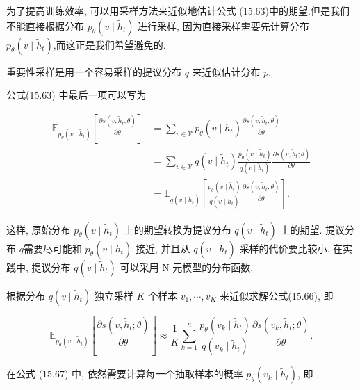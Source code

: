 \documentclass[10pt]{article}
\begin{document}
为了提高训练效率, 可以用采样方法来近似地估计公式 (15.63)中的期望.但是我们不能直接根据分布 $p_{\theta}\left(v \mid \tilde{h}_{t}\right)$ 进行采样, 因为直接采样需要先计算分布 $p_{\theta}\left(v \mid \tilde{h}_{t}\right)$,而这正是我们希望避免的.

重要性采样是用一个容易采样的提议分布 $q$ 来近似估计分布 $p$.

公式(15.63) 中最后一项可以写为


\begin{align*}
\mathbb{E}_{p_{\theta}\left(v \mid \tilde{h}_{t}\right)}\left[\frac{\partial s\left(v, \tilde{h}_{t} ; \theta\right)}{\partial \theta}\right] & =\sum_{v \in \mathcal{V}} p_{\theta}\left(v \mid \tilde{h}_{t}\right) \frac{\partial s\left(v, \tilde{h}_{t} ; \theta\right)}{\partial \theta}  \tag{15.64}\\
& =\sum_{v \in \mathcal{V}} q\left(v \mid \tilde{h}_{t}\right) \frac{p_{\theta}\left(v \mid \tilde{h}_{t}\right)}{q\left(v \mid \tilde{h}_{t}\right)} \frac{\partial s\left(v, \tilde{h}_{t} ; \theta\right)}{\partial \theta}  \tag{15.65}\\
& =\mathbb{E}_{q\left(v \mid \tilde{h}_{t}\right)}\left[\frac{p_{\theta}\left(v \mid \tilde{h}_{t}\right)}{q\left(v \mid \tilde{h}_{t}\right)} \frac{\partial s\left(v, \tilde{h}_{t} ; \theta\right)}{\partial \theta}\right] . \tag{15.66}
\end{align*}


这样, 原始分布 $p_{\theta}\left(v \mid \tilde{h}_{t}\right)$ 上的期望转换为提议分布 $q\left(v \mid \tilde{h}_{t}\right)$ 上的期望. 提议分布 $q$需要尽可能和 $p_{\theta}\left(v \mid \tilde{h}_{t}\right)$ 接近, 并且从 $q\left(v \mid \tilde{h}_{t}\right)$ 采样的代价要比较小. 在实践中, 提议分布 $q\left(v \mid \tilde{h}_{t}\right)$ 可以采用 $\mathrm{N}$ 元模型的分布函数.

根据分布 $q\left(v \mid \tilde{h}_{t}\right)$ 独立采样 $K$ 个样本 $v_{1}, \cdots, v_{K}$ 来近似求解公式(15.66), 即


\begin{equation*}
\mathbb{E}_{p_{\theta}\left(v \mid \tilde{h}_{t}\right)}\left[\frac{\partial s\left(v, \tilde{h}_{t} ; \theta\right)}{\partial \theta}\right] \approx \frac{1}{K} \sum_{k=1}^{K} \frac{p_{\theta}\left(v_{k} \mid \tilde{h}_{t}\right)}{q\left(v_{k} \mid \tilde{h}_{t}\right)} \frac{\partial s\left(v_{k}, \tilde{h}_{t} ; \theta\right)}{\partial \theta} . \tag{15.67}
\end{equation*}


在公式 (15.67) 中, 依然需要计算每一个抽取样本的概率 $p_{\theta}\left(v_{k} \mid \tilde{h}_{t}\right)$, 即
\end{document}
